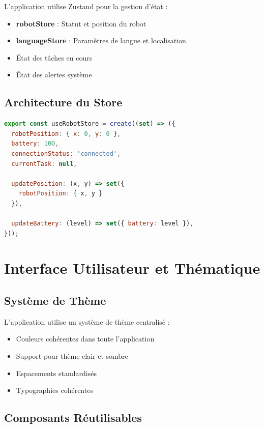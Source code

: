 \documentclass[12pt,a4paper,oneside]{report}
\begin{document}
L'application utilise Zustand pour la gestion d'état :

\begin{itemize}
  \item \textbf{robotStore} : Statut et position du robot
  \item \textbf{languageStore} : Paramètres de langue et localisation
  \item État des tâches en cours
  \item État des alertes système
\end{itemize}

\subsection{Architecture du Store}

\begin{lstlisting}[language=JavaScript]
export const useRobotStore = create((set) => ({
  robotPosition: { x: 0, y: 0 },
  battery: 100,
  connectionStatus: 'connected',
  currentTask: null,
  
  updatePosition: (x, y) => set({ 
    robotPosition: { x, y } 
  }),
  
  updateBattery: (level) => set({ battery: level }),
}));
\end{lstlisting}

\section{Interface Utilisateur et Thématique}

\subsection{Système de Thème}

L'application utilise un système de thème centralisé :

\begin{itemize}
  \item Couleurs cohérentes dans toute l'application
  \item Support pour thème clair et sombre
  \item Espacements standardisés
  \item Typographies cohérentes
\end{itemize}

\subsection{Composants Réutilisables}
\end{document}
